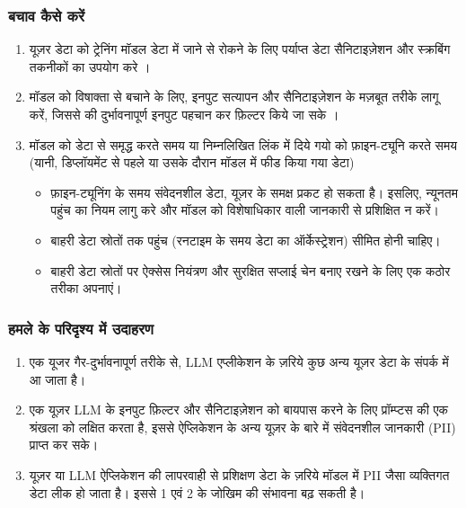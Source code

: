 \documentclass[
]{article}
\providecommand{\tightlist}{%
  \setlength{\itemsep}{0pt}\setlength{\parskip}{0pt}}
\begin{document}
\subsubsection{बचाव कैसे करें}\label{ux92cux91aux935-ux915ux938-ux915ux930}

\begin{enumerate}
\def\labelenumi{\arabic{enumi}.}
\tightlist
\item
  यूज़र डेटा को ट्रेनिंग मॉडल डेटा में जाने से रोकने के लिए पर्याप्त डेटा सैनिटाइज़ेशन और
  स्क्रबिंग तकनीकों का उपयोग करे ।
\item
  मॉडल को विषाक्ता से बचाने के लिए, इनपुट सत्यापन और सैनिटाइज़ेशन के मज़बूत तरीके लागू
  करें, जिससे की दुर्भावनापूर्ण इनपुट पहचान कर फ़िल्टर किये जा सके ।
\item
  मॉडल को डेटा से समृद्ध करते समय या निम्नलिखित लिंक में दिये गयो को फ़ाइन-ट्यूनि करते
  समय (यानी, डिप्लॉयमेंट से पहले या उसके दौरान मॉडल में फीड किया गया डेटा)

  \begin{itemize}
  \tightlist
  \item
    फ़ाइन-ट्यूनिंग के समय संवेदनशील डेटा, यूज़र के समक्ष प्रकट हो सकता है। इसलिए,
    न्यूनतम पहुंच का नियम लागु करे और मॉडल को विशेषाधिकार वाली जानकारी से
    प्रशिक्षित न करें।
  \item
    बाहरी डेटा स्रोतों तक पहुंच (रनटाइम के समय डेटा का ऑर्केस्ट्रेशन) सीमित होनी
    चाहिए।
  \item
    बाहरी डेटा स्रोतों पर ऐक्सेस नियंत्रण और सुरक्षित सप्लाई चेन बनाए रखने के लिए एक
    कठोर तरीका अपनाएं।
  \end{itemize}
\end{enumerate}

\subsubsection{हमले के परिदृश्य में
उदाहरण}\label{ux939ux92eux932-ux915-ux92aux930ux926ux936ux92f-ux92e-ux909ux926ux939ux930ux923}

\begin{enumerate}
\def\labelenumi{\arabic{enumi}.}
\tightlist
\item
  एक यूजर गैर-दुर्भावनापूर्ण तरीके से, LLM एप्लीकेशन के ज़रिये कुछ अन्य यूज़र डेटा के संपर्क
  में आ जाता है।
\item
  एक यूज़र LLM के इनपुट फ़िल्टर और सैनिटाइज़ेशन को बायपास करने के लिए प्रॉम्प्टस की एक
  श्रंखला को लक्षित करता है, इससे ऐप्लिकेशन के अन्य यूज़र के बारे में संवेदनशील जानकारी
  (PII) प्राप्त कर सके।
\item
  यूज़र या LLM ऐप्लिकेशन की लापरवाही से प्रशिक्षण डेटा के ज़रिये मॉडल में PII जैसा
  व्यक्तिगत डेटा लीक हो जाता है। इससे 1 एवं 2 के जोखिम की संभावना बढ़ सकती है।
\end{enumerate}
\end{document}
